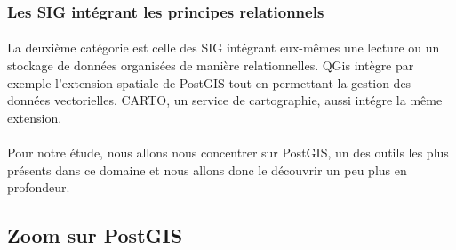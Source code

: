 \subsubsection{Les SIG intégrant les principes relationnels}
\paragraph{}La deuxième catégorie est celle des SIG intégrant eux-mêmes une lecture ou un stockage de données organisées de manière relationnelles. QGis intègre par exemple l'extension spatiale de PostGIS tout en permettant la gestion des données vectorielles. CARTO, un service de cartographie, aussi intégre la même extension.




\paragraph{}Pour notre étude, nous allons nous concentrer sur PostGIS, un des outils les plus présents dans ce domaine et nous allons donc le découvrir un peu plus en profondeur.


\subsection{Zoom sur PostGIS}
